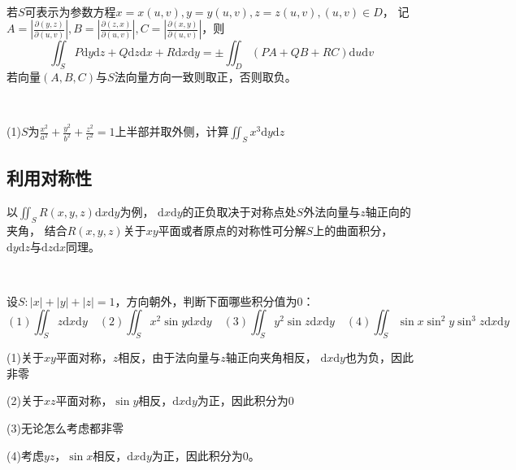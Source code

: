 ~

\begin{theorem}[参数方程法]
  若$S$可表示为参数方程$x=x(u,v),y = y(u,v),z = z(u,v), (u,v ) \in D$，
  记$A = \left| \frac{\partial (y,z)}{\partial (u,v)} \right|, B = \left| \frac{\partial (z,x)}{\partial (u,v)} \right|, C = \left| \frac{\partial(x,y)}{\partial (u,v)} \right|$，则
  \begin{equation*}
    \iint_S P\mathrm{d}y \mathrm{d}z + Q\mathrm{d} z \mathrm{d} x + R\mathrm{d} x \mathrm{d} y = \pm \iint_D (PA + QB + RC)\mathrm{d}u \mathrm{d} v
  \end{equation*}
  若向量$(A,B,C)$与$S$法向量方向一致则取正，否则取负。
\end{theorem}

~

\begin{exercise}[参数方程法]
  (1)$S$为$\frac{x^2}{a^2} + \frac{y^2}{b^2} + \frac{z^2}{c^2} = 1$上半部并取外侧，计算$\iint_S x^3\mathrm{d} y \mathrm{d} z$
\end{exercise}

\begin{solution}
  
\end{solution}

\subsection{利用对称性}

以$\iint_S R(x,y,z) \mathrm{d} x \mathrm{d} y$为例，
$\mathrm{d} x\mathrm{d} y$的正负取决于对称点处$S$外法向量与$z$轴正向的夹角，
结合$R(x,y,z)$关于$xy$平面或者原点的对称性可分解$S$上的曲面积分，
$\mathrm{d}y\mathrm{d}z$与$\mathrm{d} z \mathrm{d} x$同理。

~

\begin{exercise}[方向判断训练]
  设$S:|x| + |y| + |z| = 1$，方向朝外，判断下面哪些积分值为$0$：
  \begin{equation*}
    (1)\iint_S z \mathrm{d} x \mathrm{d} y \quad (2)\iint_S x^2 \sin y \mathrm{d} x \mathrm{d} y
    \quad (3)\iint_S y^2 \sin z \mathrm{d} x \mathrm{d} y \quad (4)\iint_S \sin x \sin^2 y \sin^3 z \mathrm{d} x \mathrm{d} y
  \end{equation*}
\end{exercise}

\begin{solution}
  (1)关于$xy$平面对称，$z$相反，由于法向量与$z$轴正向夹角相反，
  $\mathrm{d} x\mathrm{d} y$也为负，因此非零

  (2)关于$xz$平面对称，$\sin y$相反，$\mathrm{d} x\mathrm{d} y$为正，因此积分为$0$

  (3)无论怎么考虑都非零

  (4)考虑$yz$，$\sin x$相反，$\mathrm{d} x \mathrm{d} y$为正，因此积分为$0$。
\end{solution}

